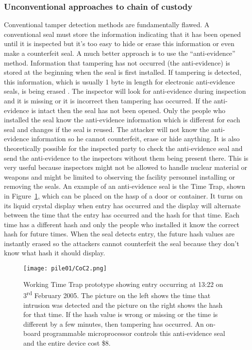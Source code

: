 \documentclass[twoside,titlepage,11pt,twocolumn,a4paper]{article}
\begin{document}
\subsubsection{Unconventional approaches to chain of custody}

Conventional tamper detection methods are fundamentally flawed. A
conventional seal must store the information indicating that it has
been opened until it is inspected but it’s too easy to hide or erase
this information or even make a counterfeit seal. A much better
approach is to use the ``anti-evidence'' method. Information that
tampering has not occurred (the anti-evidence) is stored at the
beginning when the seal is first
installed. \citep{nuclearSafeguardsAndSec2005} If tampering is
detected, this information, which is usually 1 byte in length for
electronic anti-evidence seals, is being erased
\citep{unconventionalCoC2010}.  The inspector will look for
anti-evidence during inspection and it is missing or it is incorrect
then tampering has occurred. If the anti-evidence is intact then the
seal has not been opened. Only the people who installed the seal know
the anti-evidence information which is different for each seal and
changes if the seal is reused. The attacker will not know the
anti-evidence information so he cannot counterfeit, erase or hide
anything. \citep{nuclearSafeguardsAndSec2005} It is also theoretically
possible for the inspected party to check the anti-evidence seal and
send the anti-evidence to the inspectors without them being present
there. \citep{unconventionalCoC2010} This is very useful because
inspectors might not be allowed to handle nuclear material or weapons
and might be limited to observing the facility personnel installing or
removing the seals. An example of an anti-evidence seal is the Time
Trap, shown in Figure~\ref{fig:CoC2}, which can be placed on the hasp
of a door or container. It turns on its liquid crystal display when
entry has occurred and the display will alternate between the time
that the entry has occurred and the hash for that time. Each time has
a different hash and only the people who installed it know the correct
hash for future times. When the seal detects entry, the future hash
values are instantly erased so the attackers cannot counterfeit the
seal because they don't know what hash it should
display. \citep{nuclearSafeguardsAndSec2005}

\begin{figure}
  \texttt{[image: pile01/CoC2.png]}
  \caption{Working Time Trap prototype showing entry occurring at
    13:22 on 3\textsuperscript{rd} February 2005. The picture on the
    left shows the time that intrusion was detected and the picture on
    the right shows the hash for that time. If the hash value is wrong
    or missing or the time is different by a few minutes, then
    tampering has occurred. An on-board programmable microprocessor
    controls this anti-evidence seal and the entire device cost
    \$8. \citep{nuclearSafeguardsAndSec2005}}
  \label{fig:CoC2}
\end{figure}
\end{document}
